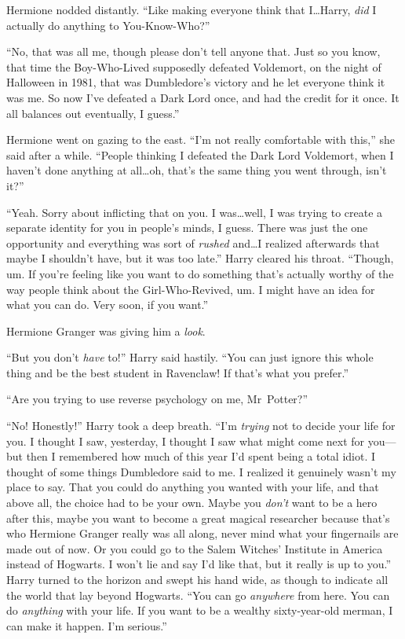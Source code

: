 Hermione nodded distantly. “Like making everyone think that I…Harry, \emph{did} I actually do anything to You-Know-Who?”

“No, that was all me, though please don’t tell anyone that. Just so you know, that time the Boy-Who-Lived supposedly defeated Voldemort, on the night of Halloween in 1981, that was Dumbledore’s victory and he let everyone think it was me. So now I’ve defeated a Dark Lord once, and had the credit for it once. It all balances out eventually, I guess.”

Hermione went on gazing to the east. “I’m not really comfortable with this,” she said after a while. “People thinking I defeated the Dark Lord Voldemort, when I haven’t done anything at all…oh, that’s the same thing you went through, isn’t it?”

“Yeah. Sorry about inflicting that on you. I was…well, I was trying to create a separate identity for you in people’s minds, I guess. There was just the one opportunity and everything was sort of \emph{rushed} and…I realized afterwards that maybe I shouldn’t have, but it was too late.” Harry cleared his throat. “Though, um. If you’re feeling like you want to do something that’s actually worthy of the way people think about the Girl-Who-Revived, um. I might have an idea for what you can do. Very soon, if you want.”

Hermione Granger was giving him a \emph{look}.

“But you don’t \emph{have} to!” Harry said hastily. “You can just ignore this whole thing and be the best student in Ravenclaw! If that’s what you prefer.”

“Are you trying to use reverse psychology on me, Mr~Potter?”

“No! Honestly!” Harry took a deep breath. “I’m \emph{trying} not to decide your life for you. I thought I saw, yesterday, I thought I saw what might come next for you—but then I remembered how much of this year I’d spent being a total idiot. I thought of some things Dumbledore said to me. I realized it genuinely wasn’t my place to say. That you could do anything you wanted with your life, and that above all, the choice had to be your own. Maybe you \emph{don’t} want to be a hero after this, maybe you want to become a great magical researcher because that’s who Hermione Granger really was all along, never mind what your fingernails are made out of now. Or you could go to the Salem Witches’ Institute in America instead of Hogwarts. I won’t lie and say I’d like that, but it really is up to you.” Harry turned to the horizon and swept his hand wide, as though to indicate all the world that lay beyond Hogwarts. “You can go \emph{anywhere} from here. You can do \emph{anything} with your life. If you want to be a wealthy sixty-year-old merman, I can make it happen. I’m serious.”

